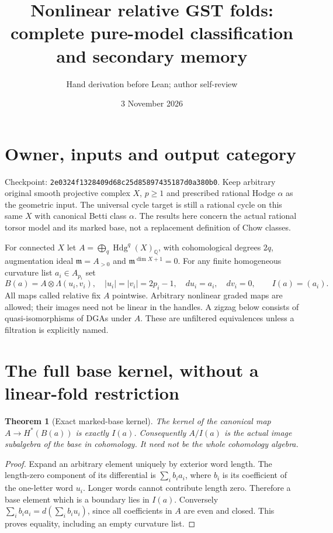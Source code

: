 \documentclass[11pt]{article}
\title{Nonlinear relative GST folds: complete pure-model classification and secondary memory}
\author{Hand derivation before Lean; author self-review}
\date{3 November 2026}
\newtheorem{theorem}{Theorem}
\newcommand{\Q}{\mathbb Q}
\begin{document}
\maketitle
\section{Owner, inputs and output category}
Checkpoint: \texttt{2e0324f1328409d68c25d85897435187d0a380b0}.
Keep arbitrary original smooth projective complex $X$, $p\geq1$ and
prescribed rational Hodge $\alpha$ as the geometric input. The universal
cycle target is still a rational cycle on this same $X$ with canonical
Betti class $\alpha$. The results here concern the actual rational torsor
model and its marked base, not a replacement definition of Chow classes.

For connected $X$ let $A=\bigoplus_q\operatorname{Hdg}^q(X)_\Q$, with
cohomological degrees $2q$, augmentation ideal $\mathfrak m=A_{>0}$ and
$\mathfrak m^{\dim X+1}=0$. For any finite homogeneous curvature list
$a_i\in A_{p_i}$ set
\[
 B(a)=A\otimes\Lambda(u_i,v_i),\quad |u_i|=|v_i|=2p_i-1,
 \quad du_i=a_i,\quad dv_i=0,\qquad I(a)=(a_i).
\]
All maps called relative fix $A$ pointwise. Arbitrary nonlinear graded
maps are allowed; their images need not be linear in the handles. A
zigzag below consists of quasi-isomorphisms of DGAs under $A$.
These are unfiltered equivalences unless a filtration is explicitly named.

\section{The full base kernel, without a linear-fold restriction}
\begin{theorem}[Exact marked-base kernel]
The kernel of the canonical map $A\longrightarrow H^*(B(a))$ is exactly
$I(a)$. Consequently $A/I(a)$ is the actual image subalgebra of the base
in cohomology. It need not be the whole cohomology algebra.
\end{theorem}
\begin{proof}
Expand an arbitrary element uniquely by exterior word length. The
length-zero component of its differential is $\sum_i b_i a_i$, where
$b_i$ is its coefficient of the one-letter word $u_i$. Longer words
cannot contribute length zero. Therefore a base element which is a
boundary lies in $I(a)$. Conversely $\sum_i b_i a_i=d(\sum_i b_i u_i)$,
since all coefficients in $A$ are even and closed. This proves equality,
including an empty curvature list.
\end{proof}
\end{document}

